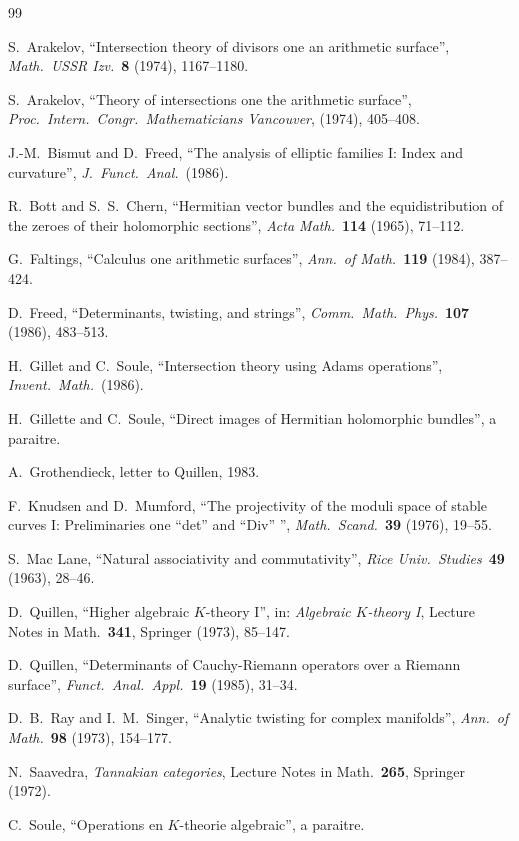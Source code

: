 \documentclass[12pt,a4paper]{article}
\theoremstyle{plain}
\theoremstyle{definition}
\begin{document}
\begin{thebibliography}{99}

 S.~Arakelov, ``Intersection theory of divisors one an arithmetic surface'', \textit{Math.\ USSR Izv.}\ \textbf{8} (1974), 1167--1180.

 S.~Arakelov, ``Theory of intersections one the arithmetic surface'', \textit{Proc.\ Intern.\ Congr.\ Mathematicians Vancouver}, (1974), 405--408.

 J.-M.~Bismut and D.~Freed, ``The analysis of elliptic families I: Index and curvature'', \textit{J.\ Funct.\ Anal.}\ (1986).

 R.~Bott and S.~S.~Chern, ``Hermitian vector bundles and the equidistribution of the zeroes of their holomorphic sections'', \textit{Acta Math.}\ \textbf{114} (1965), 71--112.

 G.~Faltings, ``Calculus one arithmetic surfaces'', \textit{Ann.\ of Math.}\ \textbf{119} (1984), 387--424.

 D.~Freed, ``Determinants, twisting, and strings'', \textit{Comm.\ Math.\ Phys.}\ \textbf{107} (1986), 483--513.

 H.~Gillet and C.~Soule, ``Intersection theory using Adams operations'', \textit{Invent.\ Math.}\ (1986).

 H.~Gillette and C.~Soule, ``Direct images of Hermitian holomorphic bundles'', a paraitre.

 A.~Grothendieck, letter to Quillen, 1983.

 F.~Knudsen and D.~Mumford, ``The projectivity of the moduli space of stable curves I: Preliminaries one ``det'' and ``Div'' '', \textit{Math.\ Scand.}\ \textbf{39} (1976), 19--55.

 S.~Mac Lane, ``Natural associativity and commutativity'', \textit{Rice Univ.\ Studies}\ \textbf{49} (1963), 28--46.

 D.~Quillen, ``Higher algebraic $K$-theory I'', in: \textit{Algebraic $K$-theory I}, Lecture Notes in Math.\ \textbf{341}, Springer (1973), 85--147.

 D.~Quillen, ``Determinants of Cauchy-Riemann operators over a Riemann surface'', \textit{Funct.\ Anal.\ Appl.}\ \textbf{19} (1985), 31--34.

 D.~B.~Ray and I.~M.~Singer, ``Analytic twisting for complex manifolds'', \textit{Ann.\ of Math.}\ \textbf{98} (1973), 154--177.

 N.~Saavedra, \textit{Tannakian categories}, Lecture Notes in Math.\ \textbf{265}, Springer (1972).

 C.~Soule, ``Operations en $K$-theorie algebraic'', a paraitre.

\end{thebibliography}
\end{document}
